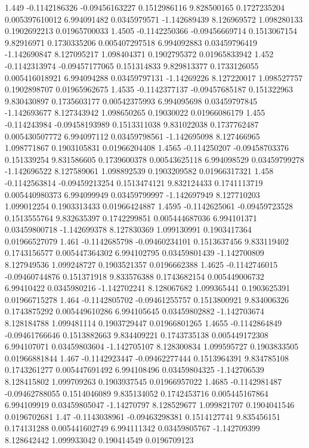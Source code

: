 {1.449 -0.1142186326 -0.09456163227 0.1512986116 9.828500165 0.1727235204 0.005397610012 6.994091482 0.0345979571 -1.142689439 8.126969572 1.098280133 0.1902692213 0.01965700033
1.4505 -0.1142250366 -0.09456669714 0.1513067154 9.82916971 0.1730335206 0.005407297518 6.994092883 0.03459796419 -1.142690847 8.127095217 1.098404371 0.1902795372 0.01965833942
1.452 -0.1142313974 -0.09457177065 0.151314833 9.829813377 0.1733126055 0.005416018921 6.994094288 0.03459797131 -1.14269226 8.127220017 1.098527757 0.1902898707 0.01965962675
1.4535 -0.1142377137 -0.09457685187 0.151322963 9.830430897 0.1735603177 0.00542375993 6.994095698 0.03459797845 -1.142693677 8.127343942 1.098650265 0.19030022 0.01966086179
1.455 -0.114243984 -0.09458193989 0.1513311038 9.831022038 0.1737762487 0.005430507772 6.994097112 0.03459798561 -1.142695098 8.127466965 1.098771867 0.1903105831 0.01966204408
1.4565 -0.114250207 -0.09458703376 0.151339254 9.831586605 0.1739600378 0.00543625118 6.994098529 0.03459799278 -1.142696522 8.127589061 1.098892539 0.1903209582 0.01966317321
1.458 -0.1142563814 -0.09459213254 0.1513474121 9.832124433 0.1741113719 0.005440980373 6.994099949 0.03459799997 -1.142697949 8.127710203 1.099012254 0.1903313433 0.01966424887
1.4595 -0.1142625061 -0.09459723528 0.1513555764 9.832635397 0.1742299851 0.005444687036 6.994101371 0.03459800718 -1.142699378 8.127830369 1.099130991 0.1903417364 0.01966527079
1.461 -0.1142685798 -0.09460234101 0.1513637456 9.833119402 0.1743156577 0.005447364302 6.994102795 0.03459801439 -1.142700809 8.127949536 1.099248727 0.1903521357 0.0196662388
1.4625 -0.1142746015 -0.09460744876 0.151371918 9.833576388 0.1743682154 0.005449006732 6.99410422 0.0345980216 -1.142702241 8.128067682 1.099365441 0.1903625391 0.01966715278
1.464 -0.1142805702 -0.09461255757 0.1513800921 9.834006326 0.1743875292 0.005449610286 6.994105645 0.03459802882 -1.142703674 8.128184788 1.099481114 0.1903729447 0.01966801265
1.4655 -0.1142864849 -0.09461766646 0.1513882663 9.834409221 0.1743735138 0.005449172308 6.994107071 0.03459803604 -1.142705107 8.128300834 1.099595727 0.1903833505 0.01966881844
1.467 -0.1142923447 -0.09462277444 0.1513964391 9.834785108 0.1743261277 0.005447691492 6.994108496 0.03459804325 -1.142706539 8.128415802 1.099709263 0.1903937545 0.01966957022
1.4685 -0.1142981487 -0.09462788055 0.1514046089 9.835134052 0.1742453716 0.005445167864 6.994109919 0.03459805047 -1.14270797 8.128529677 1.099821707 0.1904041546 0.0196702681
1.47 -0.1143038961 -0.09463298381 0.1514127741 9.835456151 0.174131288 0.005441602749 6.994111342 0.03459805767 -1.142709399 8.128642442 1.099933042 0.190414549 0.0196709123
}
